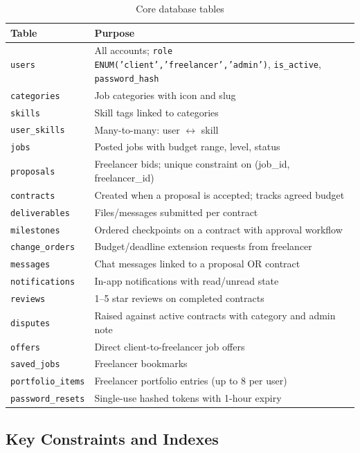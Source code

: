 \documentclass[12pt,a4paper]{article}
\begin{document}
\begin{table}[H]
\centering
\caption{Core database tables}
\begin{tabularx}{\linewidth}{lX}
\toprule
\textbf{Table} & \textbf{Purpose} \\
\midrule
\texttt{users} & All accounts; \texttt{role ENUM('client','freelancer','admin')}, \texttt{is\_active}, \texttt{password\_hash} \\
\texttt{categories} & Job categories with icon and slug \\
\texttt{skills} & Skill tags linked to categories \\
\texttt{user\_skills} & Many-to-many: user $\leftrightarrow$ skill \\
\texttt{jobs} & Posted jobs with budget range, level, status \\
\texttt{proposals} & Freelancer bids; unique constraint on (job\_id, freelancer\_id) \\
\texttt{contracts} & Created when a proposal is accepted; tracks agreed budget \\
\texttt{deliverables} & Files/messages submitted per contract \\
\texttt{milestones} & Ordered checkpoints on a contract with approval workflow \\
\texttt{change\_orders} & Budget/deadline extension requests from freelancer \\
\texttt{messages} & Chat messages linked to a proposal OR contract \\
\texttt{notifications} & In-app notifications with read/unread state \\
\texttt{reviews} & 1--5 star reviews on completed contracts \\
\texttt{disputes} & Raised against active contracts with category and admin note \\
\texttt{offers} & Direct client-to-freelancer job offers \\
\texttt{saved\_jobs} & Freelancer bookmarks \\
\texttt{portfolio\_items} & Freelancer portfolio entries (up to 8 per user) \\
\texttt{password\_resets} & Single-use hashed tokens with 1-hour expiry \\
\bottomrule
\end{tabularx}
\end{table}

\subsection{Key Constraints and Indexes}
\end{document}
